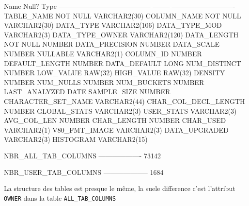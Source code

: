 \documentclass[•]{article}
\begin{document}
\begin{sql}
 Name                                      Null?    Type
 ----------------------------------------- -------- ----------------------------
 TABLE_NAME                                NOT NULL VARCHAR2(30)
 COLUMN_NAME                               NOT NULL VARCHAR2(30)
 DATA_TYPE                                          VARCHAR2(106)
 DATA_TYPE_MOD                                      VARCHAR2(3)
 DATA_TYPE_OWNER                                    VARCHAR2(120)
 DATA_LENGTH                               NOT NULL NUMBER
 DATA_PRECISION                                     NUMBER
 DATA_SCALE                                         NUMBER
 NULLABLE                                           VARCHAR2(1)
 COLUMN_ID                                          NUMBER
 DEFAULT_LENGTH                                     NUMBER
 DATA_DEFAULT                                       LONG
 NUM_DISTINCT                                       NUMBER
 LOW_VALUE                                          RAW(32)
 HIGH_VALUE                                         RAW(32)
 DENSITY                                            NUMBER
 NUM_NULLS                                          NUMBER
 NUM_BUCKETS                                        NUMBER
 LAST_ANALYZED                                      DATE
 SAMPLE_SIZE                                        NUMBER
 CHARACTER_SET_NAME                                 VARCHAR2(44)
 CHAR_COL_DECL_LENGTH                               NUMBER
 GLOBAL_STATS                                       VARCHAR2(3)
 USER_STATS                                         VARCHAR2(3)
 AVG_COL_LEN                                        NUMBER
 CHAR_LENGTH                                        NUMBER
 CHAR_USED                                          VARCHAR2(1)
 V80_FMT_IMAGE                                      VARCHAR2(3)
 DATA_UPGRADED                                      VARCHAR2(3)
 HISTOGRAM                                          VARCHAR2(15)



NBR_ALL_TAB_COLUMNS                                                             
-------------------                                                             
              73142

NBR_USER_TAB_COLUMNS                                                            
--------------------                                                            
                1684
\end{sql}
La structure des tables est presque le même, la suele difference c'est l'attribut \texttt{OWNER} dans la table \texttt{ALL\_TAB\_COLUMNS}
\end{document}
